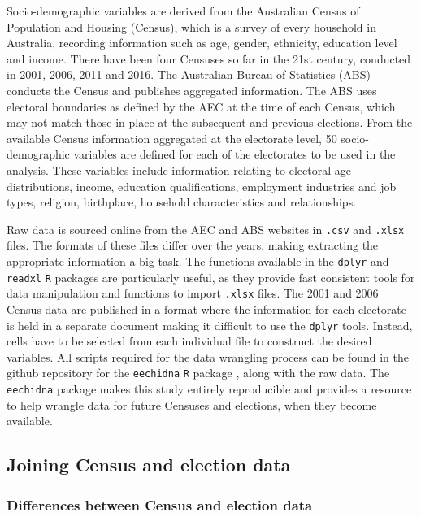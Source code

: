\documentclass[times, doublespace]{anzsauth}
\begin{document}
Socio-demographic variables are derived from the Australian Census of Population and Housing (Census), which is a survey of every household in Australia, recording information such as age, gender, ethnicity, education level and income. There have been four Censuses so far in the 21st century, conducted in 2001, 2006, 2011 and 2016. The Australian Bureau of Statistics (ABS) conducts the Census and publishes aggregated information. The ABS uses electoral boundaries as defined by the AEC at the time of each Census, which may not match those in place at the subsequent and previous elections. From the available Census information aggregated at the electorate level, 50 socio-demographic variables are defined for each of the electorates to be used in the analysis. These variables include information relating to electoral age distributions, income, education qualifications, employment industries and job types, religion, birthplace, household characteristics and relationships.

Raw data is sourced online from the AEC and ABS websites in \texttt{.csv} and \texttt{.xlsx} files. The formats of these files differ over the years, making extracting the appropriate information a big task. The functions available in the \texttt{dplyr} \citep{dplyr} and \texttt{readxl} \citep{readxl} \texttt{R} packages are particularly useful, as they provide fast consistent tools for data manipulation and functions to import \texttt{.xlsx} files. The 2001 and 2006 Census data are published in a format where the information for each electorate is held in a separate document making it difficult to use the \texttt{dplyr} tools. Instead, cells have to be selected from each individual file to construct the desired variables. All scripts required for the data wrangling process can be found in the github repository for the \texttt{eechidna} \texttt{R} package \citep{eechidna}, along with the raw data. The \texttt{eechidna} package makes this study entirely reproducible and provides a resource to help wrangle data for future Censuses and elections, when they become available.

\hypertarget{joining-census-and-election-data}{%
\subsection{Joining Census and election data}\label{joining-census-and-election-data}}

\hypertarget{differences-between-census-and-election-data}{%
\subsubsection*{Differences between Census and election data}\label{differences-between-census-and-election-data}}
\end{document}
